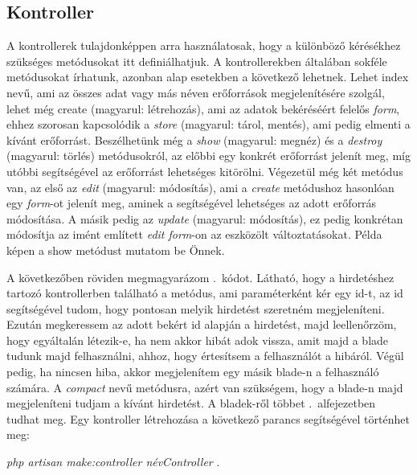 \documentclass[]{thesis-ekf}
\theoremstyle{definition}
\theoremstyle{remark}
\begin{document}
	\subsection{Kontroller}\label{sc-kontroller}
		A kontrollerek tulajdonképpen arra használatosak, hogy a különböző kérésékhez szükséges metódusokat itt definiálhatjuk. A kontrollerekben általában sokféle metódusokat írhatunk, azonban alap esetekben a következő lehetnek. Lehet index nevű, ami az összes adat vagy más néven erőforrások megjelenítésére szolgál, lehet még create (magyarul: létrehozás), ami az adatok bekéréséért felelős \emph{form}, ehhez szorosan kapcsolódik a \emph{store} (magyarul: tárol, mentés), ami pedig elmenti a kívánt erőforrást. Beszélhetünk még a \emph{show} (magyarul: megnéz) és a \emph{destroy} (magyarul: törlés) metódusokról, az előbbi egy konkrét erőforrást jelenít meg, míg utóbbi segítségével az erőforrást lehetséges kitörölni. Végezetül még két metódus van, az első az \emph{edit} (magyarul: módosítás), ami a \emph{create} metódushoz hasonlóan egy \emph{form}-ot jelenít meg, aminek a segítségével lehetséges az adott erőforrás módosítása. A másik pedig az \emph{update} (magyarul: módosítás), ez pedig konkrétan módosítja az imént említett \emph{edit form}-on az eszközölt változtatásokat. Példa képen a show metódust mutatom be Önnek. \cite{Laravel}
	
		
	
			A következőben röviden megmagyarázom .~kódot. Látható, hogy a hirdetéshez tartozó kontrollerben található a metódus, ami paraméterként kér egy id-t, az id segítségével tudom, hogy pontosan melyik hirdetést szeretném megjeleníteni. Ezután megkeressem az adott bekért id alapján a hirdetést, majd leellenőrzöm, hogy egyáltalán létezik-e, ha nem akkor hibát adok vissza, amit majd a blade tudunk majd felhasználni, ahhoz, hogy értesítsem a felhasználót a hibáról. Végül pedig, ha nincsen hiba, akkor megjelenítem egy másik blade-n a felhasználó számára. A \emph{compact} nevű metódusra, azért van szükségem, hogy a blade-n majd megjeleníteni tudjam a kívánt hirdetést. A bladek-ről többet .~alfejezetben tudhat meg.  Egy kontroller létrehozása a következő parancs segítségével történhet meg:
		\begin{center} 
			\emph{php artisan make:controller névController} .
		\end{center}
		  
\end{document}
